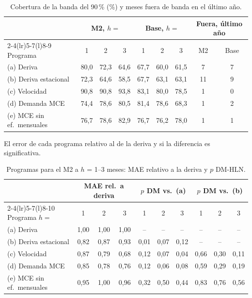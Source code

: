 \begin{table}[H]\centering\small
\caption{Cobertura de la banda del 90\,\% (\%) y meses fuera de banda en el último año.}\label{t:cob}
\setlength{\tabcolsep}{4pt}
\begin{tabular}{@{}l*{8}{c}@{}}
\toprule
 & \multicolumn{3}{c}{M2, $h=$} & \multicolumn{3}{c}{Base, $h=$} & \multicolumn{2}{c}{Fuera, último año}\\
\cmidrule(lr){2-4}\cmidrule(lr){5-7}\cmidrule(l){8-9}
Programa & 1 & 2 & 3 & 1 & 2 & 3 & M2 & Base\\
\midrule
(a) Deriva & 80,0 & 72,3 & 64,6 & 67,7 & 60,0 & 61,5 & 7 & 7\\
(b) Deriva estacional & 72,3 & 64,6 & 58,5 & 67,7 & 63,1 & 63,1 & 11 & 9\\
(c) Velocidad & 90,8 & 90,8 & 93,8 & 83,1 & 80,0 & 78,5 & 1 & 0\\
(d) Demanda MCE & 74,4 & 78,6 & 80,5 & 81,4 & 78,6 & 68,3 & 1 & 2\\
(e) MCE sin ef.\ mensuales & 76,7 & 78,6 & 82,9 & 76,7 & 76,2 & 78,0 & 1 & 1\\
\bottomrule
\end{tabular}
\end{table}

 El error de cada programa relativo al de la deriva y si la diferencia es significativa.
\begin{table}[H]\centering\small
\caption{Programas para el M2 a $h$ = 1--3 meses: MAE relativo a la deriva y $p$ DM-HLN.}\label{t:dm}
\setlength{\tabcolsep}{4pt}
\begin{tabular}{@{}l*{9}{c}@{}}
\toprule
 & \multicolumn{3}{c}{MAE rel.\ a deriva} & \multicolumn{3}{c}{$p$ DM vs.\ (a)} & \multicolumn{3}{c}{$p$ DM vs.\ (b)}\\
\cmidrule(lr){2-4}\cmidrule(lr){5-7}\cmidrule(l){8-10}
Programa \hfill $h=$ & 1 & 2 & 3 & 1 & 2 & 3 & 1 & 2 & 3\\
\midrule
(a) Deriva & 1,00 & 1,00 & 1,00 & -- & -- & -- & -- & -- & --\\
(b) Deriva estacional & 0,82 & 0,87 & 0,93 & 0,01 & 0,07 & 0,12 & -- & -- & --\\
(c) Velocidad & 0,87 & 0,79 & 0,68 & 0,12 & 0,07 & 0,04 & 0,66 & 0,30 & 0,11\\
(d) Demanda MCE & 0,85 & 0,78 & 0,76 & 0,12 & 0,06 & 0,08 & 0,59 & 0,29 & 0,19\\
(e) MCE sin ef.\ mensuales & 0,95 & 1,00 & 0,96 & 0,32 & 0,50 & 0,44 & 0,83 & 0,76 & 0,56\\
\bottomrule
\end{tabular}
\end{table}


